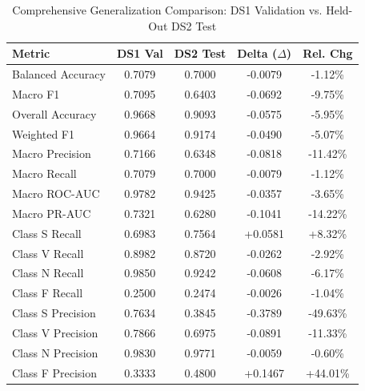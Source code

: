 \begin{table}[t]
\centering
\caption{Comprehensive Generalization Comparison: DS1 Validation vs. Held-Out DS2 Test}
\label{tab:ds1_ds2_comparison}
\begin{tabular}{lcccc}
\hline
\textbf{Metric} & \textbf{DS1 Val} & \textbf{DS2 Test} & \textbf{Delta ($\Delta$)} & \textbf{Rel. Chg} \\
\hline
Balanced Accuracy & 0.7079 & 0.7000 & -0.0079 & -1.12\% \\
Macro F1          & 0.7095 & 0.6403 & -0.0692 & -9.75\% \\
Overall Accuracy  & 0.9668 & 0.9093 & -0.0575 & -5.95\% \\
Weighted F1       & 0.9664 & 0.9174 & -0.0490 & -5.07\% \\
Macro Precision   & 0.7166 & 0.6348 & -0.0818 & -11.42\% \\
Macro Recall      & 0.7079 & 0.7000 & -0.0079 & -1.12\% \\
Macro ROC-AUC     & 0.9782 & 0.9425 & -0.0357 & -3.65\% \\
Macro PR-AUC      & 0.7321 & 0.6280 & -0.1041 & -14.22\% \\
Class S Recall    & 0.6983 & 0.7564 & +0.0581 & +8.32\% \\
Class V Recall    & 0.8982 & 0.8720 & -0.0262 & -2.92\% \\
Class N Recall    & 0.9850 & 0.9242 & -0.0608 & -6.17\% \\
Class F Recall    & 0.2500 & 0.2474 & -0.0026 & -1.04\% \\
Class S Precision & 0.7634 & 0.3845 & -0.3789 & -49.63\% \\
Class V Precision & 0.7866 & 0.6975 & -0.0891 & -11.33\% \\
Class N Precision & 0.9830 & 0.9771 & -0.0059 & -0.60\% \\
Class F Precision & 0.3333 & 0.4800 & +0.1467 & +44.01\% \\
\hline
\end{tabular}
\end{table}
